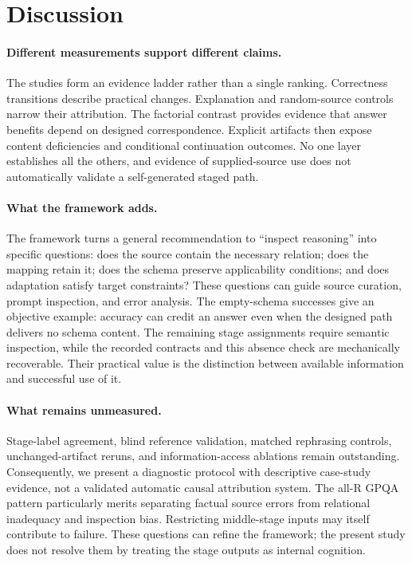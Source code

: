 \section{Discussion}
\label{sec:discussion}
\paragraph{Different measurements support different claims.}
The studies form an evidence ladder rather than a single ranking. Correctness transitions describe practical changes. Explanation and random-source controls narrow their attribution. The factorial contrast provides evidence that answer benefits depend on designed correspondence. Explicit artifacts then expose content deficiencies and conditional continuation outcomes. No one layer establishes all the others, and evidence of supplied-source use does not automatically validate a self-generated staged path.

\paragraph{What the framework adds.}
The framework turns a general recommendation to ``inspect reasoning'' into specific questions: does the source contain the necessary relation; does the mapping retain it; does the schema preserve applicability conditions; and does adaptation satisfy target constraints? These questions can guide source curation, prompt inspection, and error analysis. The empty-schema successes give an objective example: accuracy can credit an answer even when the designed path delivers no schema content. The remaining stage assignments require semantic inspection, while the recorded contracts and this absence check are mechanically recoverable. Their practical value is the distinction between available information and successful use of it.

\paragraph{What remains unmeasured.}
Stage-label agreement, blind reference validation, matched rephrasing controls, unchanged-artifact reruns, and information-access ablations remain outstanding. Consequently, we present a diagnostic protocol with descriptive case-study evidence, not a validated automatic causal attribution system. The all-R GPQA pattern particularly merits separating factual source errors from relational inadequacy and inspection bias. Restricting middle-stage inputs may itself contribute to failure. These questions can refine the framework; the present study does not resolve them by treating the stage outputs as internal cognition.
